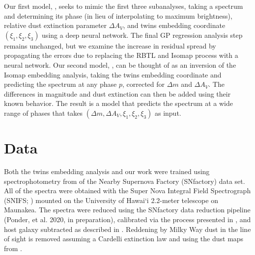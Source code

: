Our first model, \stoe, seeks to mimic the first three subanalyses, taking a spectrum and determining its phase (in lieu of interpolating to maximum brightness), relative dust extinction parameter $\Delta A_V$, and twins embedding coordinate $(\xi_1, \xi_2, \xi_3)$ using a deep neural network. The final GP regression analysis step remains unchanged, but we examine the increase in residual spread by propagating the errors due to replacing the RBTL and Isomap process with a neural network. Our second model, \etos, can be thought of as an inversion of the Isomap embedding analysis, taking the twins embedding coordinate and predicting the spectrum at any phase $p$, corrected for $\Delta m$ and $\Delta A_V$. The differences in magnitude and dust extinction can then be added using their known behavior. The result is a model that predicts the spectrum at a wide range of phases that takes $(\Delta m, \Delta A_V, \xi_1, \xi_2, \xi_3)$ as input.

\section{Data} \label{sec:nn_twins_data}
Both the twins embedding analysis and our work were trained using spectrophotometry from of the Nearby Supernova Factory (SNfactory) data set. All of the spectra were obtained with the Super Nova Integral Field Spectrograph (SNIFS; \cite{lantz_snifs_2004})  mounted on the University of Hawai`i 2.2-meter telescope on Maunakea. The spectra were reduced using the SNfactory data reduction pipeline (Ponder, et al. 2020, in preparation), calibrated via the process presented in \cite{buton_atmospheric_2013}, and host galaxy subtracted as described in \cite{bongard_3d_2011}. Reddening by Milky Way dust in the line of sight is removed assuming a Cardelli \citep{cardelli_relationship_1989} extinction law and using the dust maps from \cite{schlegel_maps_1998}.

